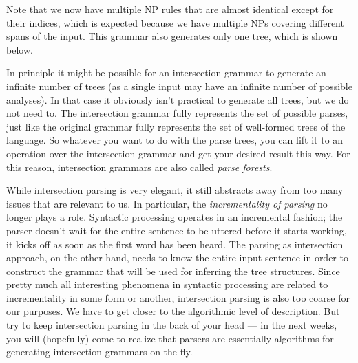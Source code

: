 Note that we now have multiple NP rules that are almost identical except for their indices, which is expected because we have multiple NPs covering different spans of the input.
This grammar also generates only one tree, which is shown below.
%
\begin{center}
\end{center}
%
In principle it might be possible for an intersection grammar to generate an infinite number of trees (as a single input may have an infinite number of possible analyses).
In that case it obviously isn't practical to generate all trees, but we do not need to.
The intersection grammar fully represents the set of possible parses, just like the original grammar fully represents the set of well-formed trees of the language.
So whatever you want to do with the parse trees, you can lift it to an operation over the intersection grammar and get your desired result this way.
For this reason, intersection grammars are also called \emph{parse forests}.

While intersection parsing is very elegant, it still abstracts away from too many issues that are relevant to us.
In particular, the \emph{incrementality of parsing} no longer plays a role.
Syntactic processing operates in an incremental fashion;
the parser doesn't wait for the entire sentence to be uttered before it starts working, it kicks off as soon as the first word has been heard.
The parsing as intersection approach, on the other hand, needs to know the entire input sentence in order to construct the grammar that will be used for inferring the tree structures.
Since pretty much all interesting phenomena in syntactic processing are related to incrementality in some form or another, intersection parsing is also too coarse for our purposes.
We have to get closer to the algorithmic level of description.
But try to keep intersection parsing in the back of your head --- in the next weeks, you will (hopefully) come to realize that parsers are essentially algorithms for generating intersection grammars on the fly.


